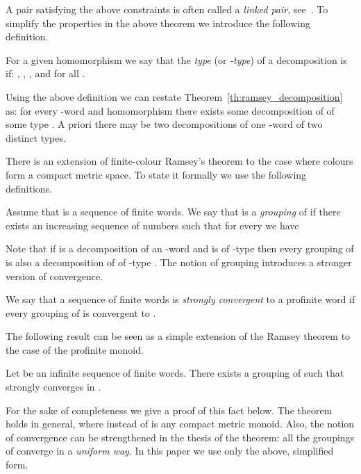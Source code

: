 \documentclass{LMCS}
\begin{document}
A pair  satisfying the above constraints is often called a \emph{linked pair}, see~\cite{perrin_pin_words}. To simplify the properties in the above theorem we introduce the following definition.

\begin{definition}
For a given homomorphism  we say that the \emph{type} (or \emph{-type}) of a decomposition  is  if: , , , and  for all .
\end{definition}

Using the above definition we can restate Theorem~\ref{th:ramsey_decomposition} as: for every -word  and homomorphism  there exists some decomposition of  of some type . A priori there may be two decompositions of one -word of two distinct types.

There is an extension of finite-colour Ramsey's theorem to the case where colours form a compact metric space. To state it formally we use the following definitions.

\begin{definition}
Assume that  is a sequence of finite words. We say that  is a \emph {grouping} of  if there exists an increasing sequence of numbers  such that for every  we have

\end{definition}

Note that if  is a decomposition of an -word  and  is of -type  then every grouping of  is also a decomposition of  of -type . The notion of grouping introduces a stronger version of convergence.

\begin{definition}
We say that a sequence of finite words  is \emph{strongly convergent} to a profinite word  if every grouping of  is convergent to .
\end{definition}

The following result can be seen as a simple extension of the Ramsey theorem to the case of the profinite monoid.

\begin{theorem}\label{th:ramsey_compact}
Let  be an infinite sequence of finite words. There exists a grouping  of  such that  strongly converges in .
\end{theorem}

For the sake of completeness we give a proof of this fact below. The theorem holds in general, where instead of  is any compact metric monoid. Also, the notion of convergence can be strengthened in the thesis of the theorem: all the groupings of  converge in a \emph{uniform way}. In this paper we use only the above, simplified form.
\end{document}
